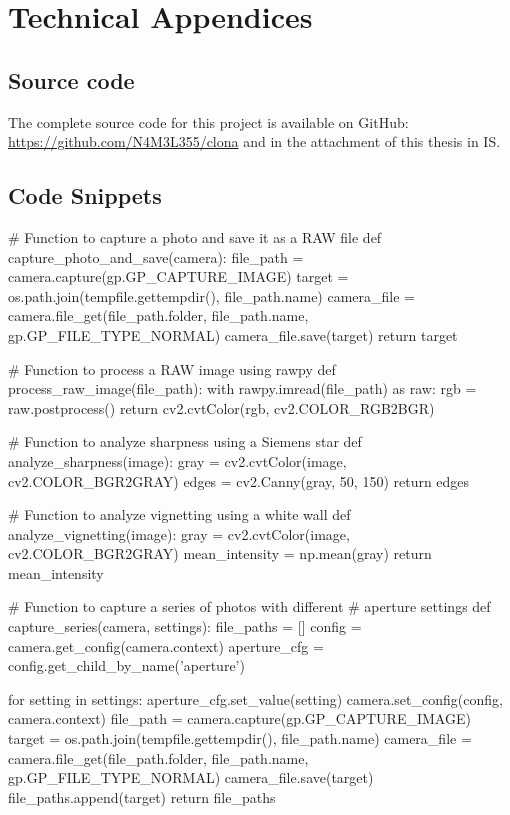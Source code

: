
\chapter{Technical Appendices}
\section{Source code}
The complete source code for this project is available on GitHub: \url{https://github.com/N4M3L355/clona} and in the attachment of this thesis in IS.

\section{Code Snippets}
\begin{spverbatim}
# Function to capture a photo and save it as a RAW file
def capture_photo_and_save(camera):
    file_path = camera.capture(gp.GP_CAPTURE_IMAGE)
    target = os.path.join(tempfile.gettempdir(), 
                          file_path.name)
    camera_file = camera.file_get(file_path.folder, 
                                  file_path.name, 
                                  gp.GP_FILE_TYPE_NORMAL)
    camera_file.save(target)
    return target

# Function to process a RAW image using rawpy
def process_raw_image(file_path):
    with rawpy.imread(file_path) as raw:
        rgb = raw.postprocess()
    return cv2.cvtColor(rgb, cv2.COLOR_RGB2BGR)

# Function to analyze sharpness using a Siemens star
def analyze_sharpness(image):
    gray = cv2.cvtColor(image, cv2.COLOR_BGR2GRAY)
    edges = cv2.Canny(gray, 50, 150)
    return edges

# Function to analyze vignetting using a white wall
def analyze_vignetting(image):
    gray = cv2.cvtColor(image, cv2.COLOR_BGR2GRAY)
    mean_intensity = np.mean(gray)
    return mean_intensity





# Function to capture a series of photos with different 
# aperture settings
def capture_series(camera, settings):
    file_paths = []
    config = camera.get_config(camera.context)
    aperture_cfg = config.get_child_by_name('aperture')

    for setting in settings:
        aperture_cfg.set_value(setting)
        camera.set_config(config, camera.context)
        file_path = camera.capture(gp.GP_CAPTURE_IMAGE)
        target = os.path.join(tempfile.gettempdir(), 
                              file_path.name)
        camera_file = camera.file_get(file_path.folder,
                                      file_path.name, 
                                      gp.GP_FILE_TYPE_NORMAL)
        camera_file.save(target)
        file_paths.append(target)
    return file_paths
\end{spverbatim}
